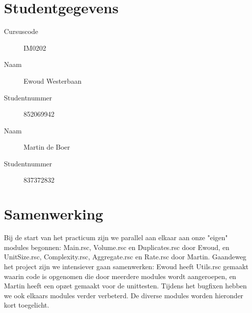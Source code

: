\documentclass[a4paper]{article}
\begin{document}
\pagestyle{fancy}

\section*{Studentgegevens}
\begin{description}
	\item [Cursuscode] IM0202
	\item [Naam] Ewoud Westerbaan
	\item [Studentnummer] 852069942
	\item [Naam] Martin de Boer
	\item [Studentnummer] 837372832
\end{description}

\section{Samenwerking}
Bij de start van het practicum zijn we parallel aan elkaar aan onze "eigen" modules begonnen: Main.rsc, Volume.rsc en Duplicates.rsc door Ewoud, en UnitSize.rsc, Complexity.rsc, Aggregate.rsc en Rate.rsc door Martin. Gaandeweg het project zijn we intensiever gaan samenwerken: Ewoud heeft Utils.rsc gemaakt waarin code is opgenomen die door meerdere modules wordt aangeroepen, en Martin heeft een opzet gemaakt voor de unittesten. Tijdens het bugfixen hebben we ook elkaars modules verder verbeterd. De diverse modules worden hieronder kort toegelicht.
\end{document}
